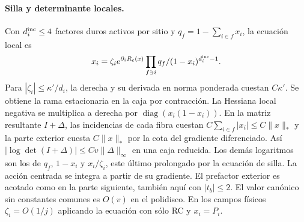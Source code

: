 \paragraph{Silla y determinante locales.}
Con $d_i^{\rm inc}\le4$ factores duros activos por sitio y $q_f=1-\sum_{i\in f}x_i$,
la ecuación local es
\[
 x_i=\zeta_i e^{\partial_i R_c(x)}
         \prod_{f\ni i} q_f/(1-x_i)^{d_i^{\rm inc}-1}.
\]
Para $|\zeta_i|\le\kappa'/d_i$, la derecha y su derivada en norma ponderada
cuestan $C\kappa'$. Se obtiene la rama estacionaria en la caja por contracción.
La Hessiana local negativa se multiplica a derecha por
$\operatorname{diag}(x_i(1-x_i))$. En la matriz resultante $I+\Delta$,
las incidencias de cada fibra cuestan $C\sum_{i\in f}|x_i|\le C\|x\|_*$
y la parte exterior cuesta $C\|x\|_*$ por la cota del gradiente diferenciado.
Así $|\log\det(I+\Delta)|\le Cv\|\Delta\|_\infty$ en una caja reducida.
Los demás logaritmos son los de $q_f$, $1-x_i$ y $x_i/\zeta_i$, este último
prolongado por la ecuación de silla. La acción centrada se integra a partir de su
gradiente. El prefactor exterior es acotado como en la parte siguiente, también aquí
con $|t_b|\le2$. El valor canónico sin constantes comunes es $O(v)$ en el polidisco.
En los campos físicos $\zeta_i=O(1/j)$ aplicando la ecuación con sólo RC y $x_i=P_i$.
